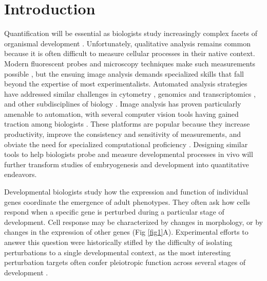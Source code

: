 \documentclass[10pt,letterpaper]{article}
\begin{document}
\section*{Introduction}
Quantification will be essential as biologists study increasingly complex facets of organismal development \cite{Oates2009}. Unfortunately, qualitative analysis remains common because it is often difficult to measure cellular processes in their native context. Modern fluorescent probes and microscopy techniques make such measurements possible \cite{Muzzey2009a,Stelzer2014,Truong2011}, but the ensuing image analysis demands specialized skills that fall beyond the expertise of most experimentalists. Automated analysis strategies have addressed similar challenges in cytometry \cite{Aghaeepour2013,Chen2015,Pyne2009}, genomics and transcriptomics \cite{Bernstein2008,Hellemans2007,Langmead2012,Trapnell2009}, and other subdisciplines of biology \cite{Costes2004,Kelley2015}. Image analysis has proven particularly amenable to automation, with several computer vision tools having gained traction among biologists \cite{Carpenter2006,Paintdakhi2016,Schindelin2012,Sommer2011}. These platforms are popular because they increase productivity, improve the consistency and sensitivity of measurements, and obviate the need for specialized computational proficiency \cite{Jug2014,Sbalzarini2016,Schindelin2015}. Designing similar tools to help biologists probe and measure developmental processes in vivo will further transform studies of embryogenesis and development into quantitative endeavors.

Developmental biologists study how the expression and function of individual genes coordinate the emergence of adult phenotypes. They often ask how cells respond when a specific gene is perturbed during a particular stage of development. Cell response may be characterized by changes in morphology, or by changes in the expression of other genes (Fig \ref{fig1}A). Experimental efforts to answer this question were historically stifled by the difficulty of isolating perturbations to a single developmental context, as the most interesting perturbation targets often confer pleiotropic function across several stages of development \cite{IanSimpson2002,Parody1993,Shilo1991}. 
\end{document}
